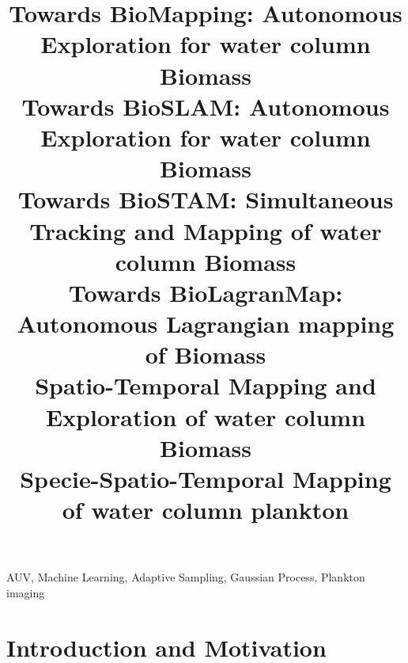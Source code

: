 \documentclass[conference]{IEEEtran}
\begin{document}
\title{Towards BioMapping: Autonomous Exploration for water column Biomass\\
{\footnotesize 
Towards BioSLAM: Autonomous Exploration for water column Biomass\\
Towards BioSTAM: Simultaneous Tracking and Mapping of water column Biomass\\
Towards BioLagranMap: Autonomous Lagrangian mapping of Biomass\\
Spatio-Temporal Mapping and Exploration of water column Biomass\\
Specie-Spatio-Temporal Mapping of water column plankton\\
}
}

\author{
}
\maketitle



\begin{IEEEkeywords}
AUV, Machine Learning, Adaptive Sampling, Gaussian Process, Plankton imaging
\end{IEEEkeywords}

\section{Introduction and Motivation}
\end{document}
